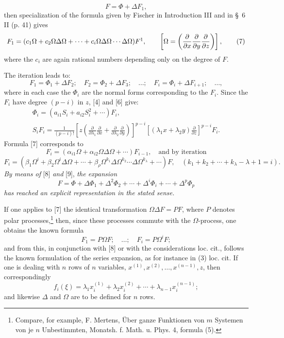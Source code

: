 \documentclass[11pt]{article}
\providecommand{\p}{\partial}
\begin{document}
\begin{equation}
        F=\Phi+\Delta F_1,
\tag{2a}
\end{equation}
then specialization of the formula given by Fischer in Introduction III and in \S~6 II (p. 41) gives
\begin{equation}
        F_1=(c_1\Omega+c_2\Omega\Delta\Omega+\cdots+c_i\Omega\Delta\Omega\cdots\Delta\Omega)F\footnotemark,
        \qquad \left[\Omega=\left(\frac{\p}{\p x}\frac{\p}{\p y}\frac{\p}{\p z}\right)\right],
\tag{7}
\end{equation}
where the $c_i$ are again rational numbers depending only on the degree of $F$.

The iteration leads to:
\[
        F_1=\Phi_1+\Delta F_2;\quad F_2=\Phi_2+\Delta F_3;\quad\ldots;\quad
        F_i=\Phi_i+\Delta F_{i+1};\quad\ldots,
\]
where in each case the $\Phi_i$ are the normal forms corresponding to the $F_i$. Since the $F_i$ have degree $(p-i)$ in $z$, [4] and [6] give:
\begin{equation}
\begin{gathered}
        \Phi_i=(a_{i1}S_i+a_{i2}S_i^2+\cdots)F_i,\\
        S_iF_i=\frac1{(p-i)!}
        \left[z\left(\frac{\p}{\p\lambda_1}\frac{\p}{\p x}+
        \frac{\p}{\p\lambda_2}\frac{\p}{\p y}\right)\right]^{p-i}
        \left[(\lambda_1x+\lambda_2y)\frac{\p}{\p z}\right]^{p-i}F_i.
\end{gathered}
\tag{8}
\end{equation}
Formula [7] corresponds to
\[
        F_i=(\alpha_{i1}\Omega+\alpha_{i2}\Omega\Delta\Omega+\cdots)F_{i-1},
        \quad\text{and by iteration}
\]
\begin{equation}
        F_i=(\beta_1\Omega^i+\beta_2\Omega^i\Delta\Omega+\cdots
        +\beta_\rho\Omega^{k_1}\Delta\Omega^{k_2}\cdots\Delta\Omega^{k_\lambda}+\cdots)F,
        \quad(k_1+k_2+\cdots+k_\lambda-\lambda+1=i).
\tag{9}
\end{equation}
\emph{By means of} [8] \emph{and} [9], \emph{the expansion}
\[
        F=\Phi+\Delta\Phi_1+\Delta^2\Phi_2+\cdots+\Delta^i\Phi_i+\cdots+\Delta^p\Phi_p
\]
\emph{has reached an explicit representation in the stated sense.}

If one applies to [7] the identical transformation $\Omega\Delta F=PF$, where $P$ denotes polar processes,\footnote{Compare, for example, F. Mertens, Über ganze Funktionen von $m$ Systemen von je $n$ Unbestimmten, Monatsh. f. Math. u. Phys. 4, formula (5).} then, since these processes commute with the $\Omega$-process, one obtains the known formula
\[
        F_1=P\Omega F;\quad\ldots;\quad F_i=P\Omega^iF;
\]
and from this, in conjunction with [8] or with the considerations loc. cit., follows the known formulation of the series expansion, as for instance in (3) loc. cit. If one is dealing with $n$ rows of $n$ variables, $x^{(1)},x^{(2)},\ldots,x^{(n-1)},z$, then correspondingly
\[
        f_i(\xi)=\lambda_1x_i^{(1)}+\lambda_2x_i^{(2)}+\cdots+\lambda_{n-1}x_i^{(n-1)};
\]
and likewise $\Delta$ and $\Omega$ are to be defined for $n$ rows.
\end{document}
